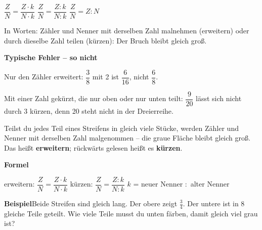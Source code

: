 \documentclass[11pt]{article}
\newcommand{\nr}[1]{\makebox[7mm][l]{\textbf{#1}}}
\begin{document}
\begin{tcolorbox}[colback=mbkasten,colframe=mbgrau,boxrule=0.5pt,arc=1mm,left=3mm,right=3mm,top=2mm,bottom=2mm,title={\bfseries Formel auf einen Blick},coltitle=black,colbacktitle=black!10]
{\Large $\dfrac{Z}{N} = \dfrac{Z \cdot k}{N \cdot k}$ \qquad $\dfrac{Z}{N} = \dfrac{Z : k}{N : k}$ \qquad $\dfrac{Z}{N} = Z : N$}\par\medskip
In Worten: Zähler und Nenner mit derselben Zahl malnehmen (erweitern) oder durch dieselbe Zahl teilen (kürzen): Der Bruch bleibt gleich groß.\par\medskip
\end{tcolorbox}
\medskip\noindent\textbf{Typische Fehler – so nicht}\par\smallskip
\noindent\nr{$\times$}Nur den Zähler erweitert: $\dfrac{3}{8}$ mit 2 ist $\dfrac{6}{16}$, nicht $\dfrac{6}{8}$.\par
\noindent\nr{$\times$}Mit einer Zahl gekürzt, die nur oben oder nur unten teilt: $\dfrac{9}{20}$ lässt sich nicht durch 3 kürzen, denn 20 steht nicht in der Dreierreihe.\par
\clearpage\label{s:A}\noindent\colorbox{black!12}{}\hspace{3mm}{\Large\bfseries Erweitern und kürzen}\par\smallskip
\noindent Teilst du jedes Teil eines Streifens in gleich viele Stücke, werden Zähler und Nenner mit derselben Zahl malgenommen – die graue Fläche bleibt gleich groß. Das heißt \textbf{erweitern}; rückwärts gelesen heißt es \textbf{kürzen}.\par\medskip
\noindent\textbf{Formel}\par\nopagebreak\noindent\hspace*{4mm}\begin{minipage}{\dimexpr\linewidth-4mm\relax}erweitern: $\dfrac{Z}{N} = \dfrac{Z \cdot k}{N \cdot k}$ \qquad kürzen: $\dfrac{Z}{N} = \dfrac{Z : k}{N : k}$ \qquad $k$ = neuer Nenner $:$ alter Nenner\end{minipage}\par\medskip
\noindent\textbf{Beispiel}\quad Beide Streifen sind gleich lang. Der obere zeigt $\frac{3}{4}$. Der untere ist in 8 gleiche Teile geteilt. Wie viele Teile musst du unten färben, damit gleich viel grau ist?\par\smallskip
\end{document}
